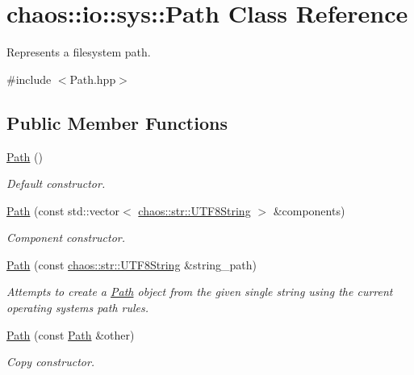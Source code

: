 \hypertarget{classchaos_1_1io_1_1sys_1_1_path}{}\section{chaos\+:\+:io\+:\+:sys\+:\+:Path Class Reference}
\label{classchaos_1_1io_1_1sys_1_1_path}


Represents a filesystem path.  




{\ttfamily \#include $<$Path.\+hpp$>$}

\subsection*{Public Member Functions}
\begin{DoxyCompactItemize}
\item 
\hyperlink{classchaos_1_1io_1_1sys_1_1_path_a4212b2acfcc365769080ea5e915568ee}{Path} ()
\begin{DoxyCompactList}\small\item\em Default constructor. \end{DoxyCompactList}\item 
\hyperlink{classchaos_1_1io_1_1sys_1_1_path_a2a11efaadadf26eb1dbc10d042897733}{Path} (const std\+::vector$<$ \hyperlink{classchaos_1_1str_1_1_u_t_f8_string}{chaos\+::str\+::\+U\+T\+F8\+String} $>$ \&components)
\begin{DoxyCompactList}\small\item\em Component constructor. \end{DoxyCompactList}\item 
\hyperlink{classchaos_1_1io_1_1sys_1_1_path_a89fa5ef128e90098b3e7db3aed3055ba}{Path} (const \hyperlink{classchaos_1_1str_1_1_u_t_f8_string}{chaos\+::str\+::\+U\+T\+F8\+String} \&string\+\_\+path)
\begin{DoxyCompactList}\small\item\em Attempts to create a \hyperlink{classchaos_1_1io_1_1sys_1_1_path}{Path} object from the given single string using the current operating system\textquotesingle{}s path rules. \end{DoxyCompactList}\item 
\hyperlink{classchaos_1_1io_1_1sys_1_1_path_a40b3bf651b667adbd3eeb1ee55564211}{Path} (const \hyperlink{classchaos_1_1io_1_1sys_1_1_path}{Path} \&other)
\begin{DoxyCompactList}\small\item\em Copy constructor. \end{DoxyCompactList}\item 

\end{DoxyCompactItemize}
